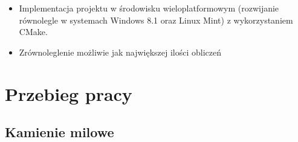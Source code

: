 \documentclass[polish, 12pt]{aghthesis}
\begin{document}
		\begin{itemize}
		
			\item Implementacja projektu w środowisku wieloplatformowym (rozwijanie równolegle w systemach Windows 8.1 oraz Linux Mint) z wykorzystaniem CMake.
			\item Zrównoleglenie możliwie jak największej ilości obliczeń
		
		\end{itemize}

\section{Przebieg pracy}
	
	\subsection{Kamienie milowe}
	
\end{document}
